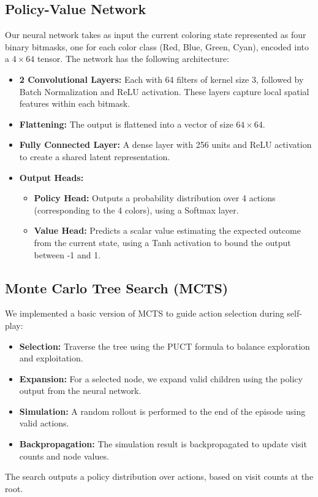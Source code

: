 \documentclass[12pt]{article}
\begin{document}
\subsection{Policy-Value Network}
Our neural network takes as input the current coloring state represented as four binary bitmasks, one for each color class (Red, Blue, Green, Cyan), encoded into a $4 \times 64$ tensor. The network has the following architecture:
\begin{itemize}
    \item \textbf{2 Convolutional Layers:} Each with 64 filters of kernel size 3, followed by Batch Normalization and ReLU activation. These layers capture local spatial features within each bitmask.
    \item \textbf{Flattening:} The output is flattened into a vector of size $64 \times 64$.
    \item \textbf{Fully Connected Layer:} A dense layer with 256 units and ReLU activation to create a shared latent representation.
    \item \textbf{Output Heads:}
    \begin{itemize}
        \item \textbf{Policy Head:} Outputs a probability distribution over 4 actions (corresponding to the 4 colors), using a Softmax layer.
        \item \textbf{Value Head:} Predicts a scalar value estimating the expected outcome from the current state, using a Tanh activation to bound the output between -1 and 1.
    \end{itemize}
\end{itemize}

\subsection{Monte Carlo Tree Search (MCTS)}
We implemented a basic version of MCTS to guide action selection during self-play:
\begin{itemize}
    \item \textbf{Selection:} Traverse the tree using the PUCT formula to balance exploration and exploitation.
    \item \textbf{Expansion:} For a selected node, we expand valid children using the policy output from the neural network.
    \item \textbf{Simulation:} A random rollout is performed to the end of the episode using valid actions.
    \item \textbf{Backpropagation:} The simulation result is backpropagated to update visit counts and node values.
\end{itemize}
The search outputs a policy distribution over actions, based on visit counts at the root.
\end{document}
